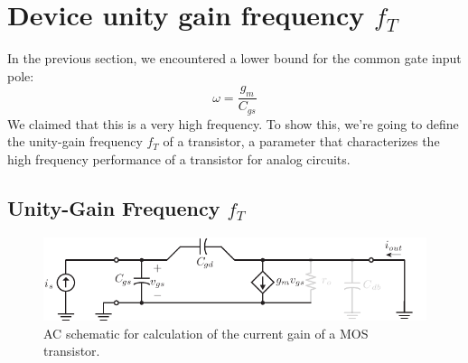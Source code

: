 \section{Device unity gain frequency $f_T$}

In the previous section, we encountered a lower bound for the common gate input pole:
%
\begin{equation}
	\omega = \frac{g_m}{C_{gs}}
\end{equation}
%
We claimed that this is a very high frequency.  To show this, we're going to define the unity-gain frequency $f_T$ of a transistor, a parameter that characterizes the high frequency performance of a transistor for analog circuits.



\subsection{Unity-Gain Frequency $f_T$}

\begin{figure}[tb]
\begin{center}
\includegraphics[scale=1]{hybrid_pi_ft}
\end{center}
\caption{AC schematic for calculation of the current gain of a MOS transistor.} \label{fig:hybrid_pi_ft}
\end{figure}

